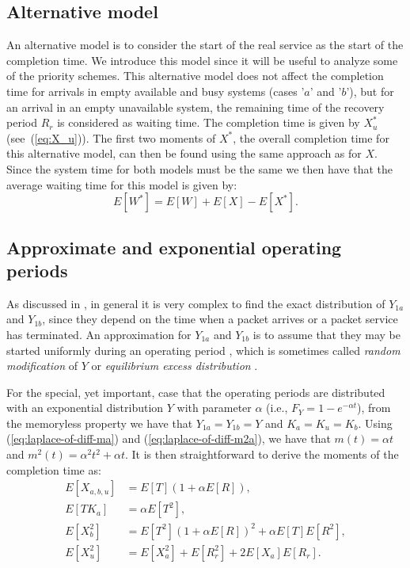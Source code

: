 \documentclass[11pt,journal,oneside,onecolumn,draftclsnofoot]{IEEEtran}
\begin{document}
\subsection{Alternative model}
\label{sec:alt_model}

An alternative model is to consider the start of the real service as the start of the completion time. We introduce this model since it will be useful to analyze some of the priority schemes. This alternative model does not affect the completion time for arrivals in empty available and busy systems (cases '$a$' and '$b$'), but for an arrival in an empty unavailable system, the remaining time of the recovery period $R_r$ is considered as waiting time. The completion time is given by $X_u^*$ (see~(\ref{eq:X_u})). The first two moments of $X^*$, the overall completion time for this alternative model, can then be found using the same approach as for $X$. Since the system time for both models must be the same we then have that the average waiting time for this model is given by:
\begin{equation}
E[W^*]=E[W]+E[X]-E[X^*].
\label{eq::waitingtime-case2}
\end{equation}


\subsection{Approximate and exponential operating periods}
\label{subsec:Exp-Av-periods}

As discussed in \cite{federgruen86}, in general it is very complex to find the exact distribution of $Y_{1a}$ and $Y_{1b}$, since they depend on the time when a packet arrives or a packet service has terminated. An approximation for $Y_{1a}$  and $Y_{1b}$ is to assume that they may be started uniformly during an operating period \cite{azarfar12e}, which is sometimes called \emph{random modification} of $Y$ \cite{avi-itzhak63} or \emph{equilibrium excess distribution} \cite{federgruen86}.


For the special, yet important, case that the operating periods are distributed with an exponential distribution $Y$ with parameter $\alpha$ (i.e., $F_{Y}=1-e^{-{\alpha}t}$), from the memoryless property we have that $Y_{1a}=Y_{1b}=Y$ and $K_a=K_u=K_b$. Using (\ref{eq:laplace-of-diff-ma}) and (\ref{eq:laplace-of-diff-m2a}), we have that $m(t)=\alpha t$ and $m^2(t)=\alpha^2 t^2+\alpha t$. It is then straightforward to derive the moments of the completion time as:
\begin{align}
E[X_{a,b,u}]&=E[T] (1+\alpha E[R]), \\
\label{eq:avg-xa-Exp}
E[TK_a]& =\alpha E[T^2],\\
\label{eq:ETKa}
E[X^2_{b}]& =E[T^2](1+\alpha E[R])^2+ \alpha E[T]E[R^2], \\
\label{eq:avg-x2a-Exp}
E[X^{2}_{u}] &=E[X^2_{a}]+E[R_{r}^2]+2E[X_{a}]E[R_{r}].
\end{align}
\end{document}
